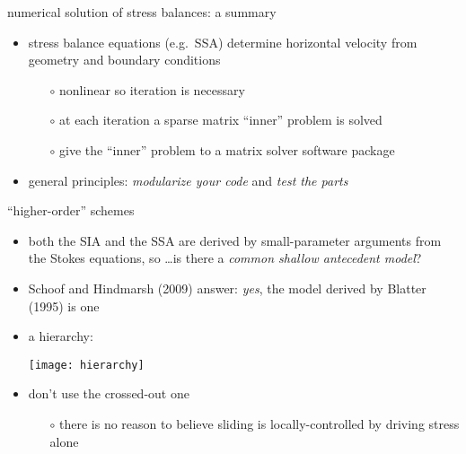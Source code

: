 \begin{frame}{numerical solution of stress balances: a summary}

\begin{itemize}
\item stress balance equations (e.g.~SSA) determine horizontal velocity from geometry and boundary conditions
  \begin{itemize}
  \item[$\circ$] nonlinear so iteration is necessary
  \item[$\circ$] at each iteration a sparse matrix ``inner'' problem is solved
  \item[$\circ$] give the ``inner'' problem to a matrix solver software package
  \end{itemize}

\bigskip
\item general principles: \emph{modularize your code} and \emph{test the parts}
\end{itemize}
\end{frame}


\begin{frame}{``higher-order'' schemes}

\begin{itemize}
\item both the SIA and the SSA are derived by small-parameter arguments from the Stokes equations, so \dots is there a \emph{common shallow antecedent model}?
\item Schoof and Hindmarsh (2009) answer:  \emph{yes}, the model derived by Blatter (1995) is one
\item a hierarchy:
\begin{center}
\texttt{[image: hierarchy]}
\end{center}
\item don't use the crossed-out one
  \begin{itemize}
  \item[$\circ$] there is no reason to believe sliding is locally-controlled by driving stress alone
  \end{itemize}
\end{itemize}
\end{frame}


